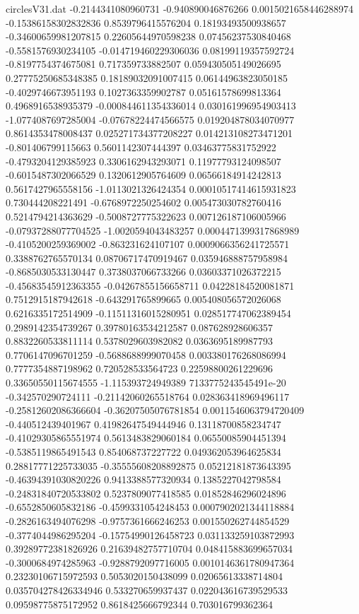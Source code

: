 \begin{filecontents}{circlesV31.dat}
-0.2144341080960731	-0.940890046876266	0.0015021658446288974
-0.15386158302832836	0.8539796415576204	0.18193493500938657
-0.34600659981207815	0.22605644970598238	0.07456237530840468
-0.5581576930234105	-0.014719460229306036	0.08199119357592724
-0.8197754374675081	0.717359733882507	0.059430505149026695
0.27775250685348385	0.18189032091007415	0.06144963823050185
-0.4029746673951193	0.1027363359902787	0.05161578699813364
0.4968916538935379	-0.000844611354336014	0.030161996954903413
-1.0774087697285004	-0.07678224474566575	0.019204878034070977
0.8614353478008437	0.025271734377208227	0.014213108273471201
-0.801406799115663	0.5601142307444397	0.03463775831752922
-0.4793204129385923	0.3306162943293071	0.11977793124098507
-0.6015487302066529	0.1320612905764609	0.06566184914242813
0.5617427965558156	-1.0113021326424354	0.00010517414615931823
0.730444208221491	-0.6768972250254602	0.005473030782760416
0.5214794214363629	-0.5008727775322623	0.007126187106005966
-0.07937288077704525	-1.0020594043483257	0.0004471399317868989
-0.4105200259369002	-0.863231624107107	0.0009066356241725571
0.3388762765570134	0.08706717470919467	0.035946888757958984
-0.8685030533130447	0.3738037066733266	0.03603371026372215
-0.45683545912363355	-0.04267855156658711	0.04228184520081871
0.7512915187942618	-0.643291765899665	0.005408056572026068
0.6216335172514909	-0.11511316015280951	0.028517747062389454
0.2989142354739267	0.39780163534212587	0.087628928606357
0.8832260533811114	0.5378029603982082	0.0363695189987793
0.7706147096701259	-0.5688688999070458	0.003380176268086994
0.7777354887198962	0.720528533564723	0.22598800261229696
0.33650550115674555	-1.115393724949389	7133775243545491e-20
-0.342570290724111	-0.21142060265518764	0.028363418969496117
-0.25812602086366604	-0.36207505076781854	0.0011546063794720409
-0.440512439401967	0.41982647549444946	0.13118700858234747
-0.41029305865551974	0.5613483829060184	0.06550085904451394
-0.5385119865491543	0.854068737227722	0.049362053964625834
0.28817771225733035	-0.35555608208892875	0.05212181873643395
-0.46394391030820226	0.9413388577320934	0.1385227042798584
-0.24831840720533802	0.5237809077418585	0.01852846296024896
-0.6552850605832186	-0.4599331054248453	0.0007902021344118884
-0.2826163494076298	-0.9757361666246253	0.001550262744854529
-0.3774044986295204	-0.15754990126458723	0.031133259103872993
0.39289772381826926	0.21639482757710704	0.048415883699657034
-0.3000684974285963	-0.9288792097716005	0.0010146361780947364
0.23230106715972593	0.5053020150438099	0.02065613338714804
0.035704278426334946	0.533270659937437	0.022043616739529533
0.09598775875172952	0.8618425666792344	0.703016799362364

\end{filecontents}
